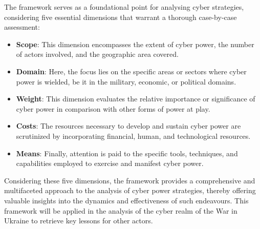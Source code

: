 \newpage

The framework serves as a foundational point for analysing cyber strategies, considering five essential dimensions that warrant a thorough case-by-case assessment:
\begin{itemize}
 \item \textbf{Scope}: This dimension encompasses the extent of cyber power, the number of actors involved, and the geographic area covered.
 \item \textbf{Domain}: Here, the focus lies on the specific areas or sectors where cyber power is wielded, be it in the military, economic, or political domains.
 \item \textbf{Weight}: This dimension evaluates the relative importance or significance of cyber power in comparison with other forms of power at play.
 \item \textbf{Costs}: The resources necessary to develop and sustain cyber power are scrutinized by incorporating financial, human, and technological resources.
 \item \textbf{Means}: Finally, attention is paid to the specific tools, techniques, and capabilities employed to exercise and manifest cyber power.
\end{itemize}

Considering these five dimensions, the framework provides a comprehensive and multifaceted approach to the analysis of cyber power strategies, thereby offering valuable insights into the dynamics and effectiveness of such endeavours. This framework will be applied in the analysis of the cyber realm of the War in Ukraine to retrieve key lessons for other actors. 


